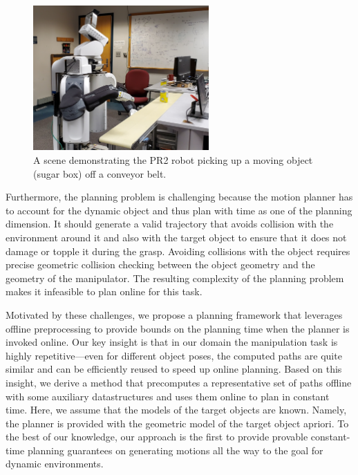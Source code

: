 \documentclass[a4paper,10pt]{article}
\begin{document}
\begin{figure}[t]
    \centering
    \includegraphics[width=0.6\textwidth]{conveyor_pr2}
    \caption{
    \CaptionTextSize
    A scene demonstrating the PR2 robot picking up a moving object (sugar box) off a conveyor belt.}
    \label{fig:intro_pic}
\end{figure}


Furthermore, the planning problem is challenging because the motion planner has to account for the dynamic object and thus plan with time as one of the planning dimension. It should generate a valid trajectory that avoids collision with the environment around it and also with the target object to ensure that it does not damage or topple it during the grasp. Avoiding collisions with the object requires precise geometric collision checking between the object geometry and the geometry of the manipulator. The resulting complexity of the planning problem makes it infeasible to plan online for this task.

Motivated by these challenges, we propose a planning framework that leverages offline preprocessing to provide bounds on the planning time when the planner is invoked online. Our key insight is that in our domain the manipulation task is highly repetitive---even for different object poses, the computed paths are quite similar and can be efficiently reused to speed up online planning. Based on this insight, we derive a method that precomputes a representative set of paths offline with some auxiliary datastructures and uses them online to plan in constant time. Here, we assume that the models of the target objects are known. Namely, the planner is provided with the geometric model of the target object apriori. To the best of our knowledge, our approach is the first to provide provable constant-time planning guarantees on generating motions all the way to the goal for dynamic environments.
\end{document}
